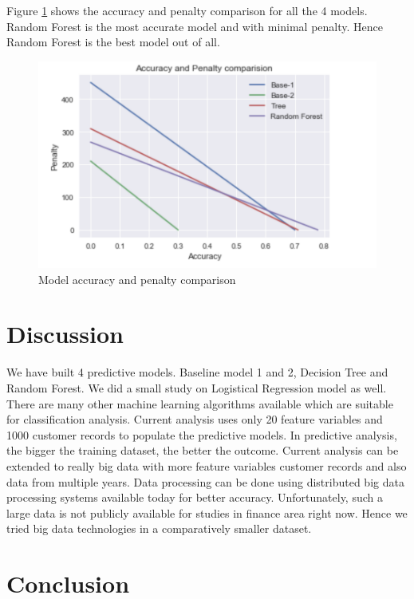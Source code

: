 \documentclass[sigconf]{acmart}
\begin{document}
Figure \ref{fig:Figure21} shows the accuracy and penalty comparison for all the 4 models. Random Forest is the most accurate model and with minimal penalty. Hence Random Forest is the best model out of all.

\begin{figure}[htb]
  \centering
  \includegraphics[width=1.0\columnwidth]{images/Figure21.png}
  \caption{Model accuracy and penalty comparison
  \cite{german-credit-sri-sai}}
  \label{fig:Figure21} 
\end{figure}

\section{Discussion}

We have built 4 predictive models. Baseline model 1 and 2, Decision Tree and Random Forest. We did a small study on Logistical Regression model as well. There are many other machine learning algorithms available which are suitable for classification analysis. Current analysis uses only 20 feature variables and 1000 customer records to populate the predictive models. In predictive analysis, the bigger the training dataset, the better the outcome. Current analysis can be extended to really big data with more feature variables customer records and also data from multiple years. Data processing can be done using distributed big data processing systems available today for better accuracy. Unfortunately, such a large data is not publicly available for studies in finance area right now. Hence we tried big data technologies in a comparatively smaller dataset. 


\section{Conclusion}
\end{document}
